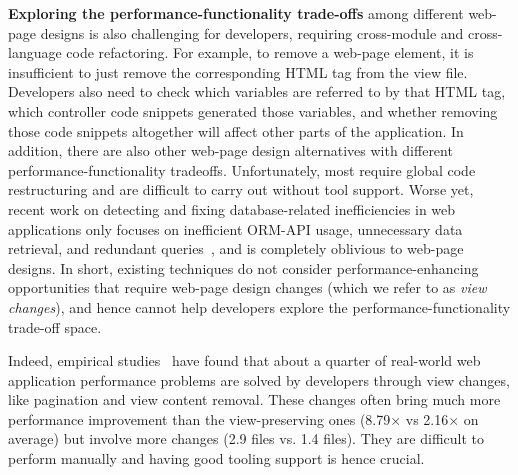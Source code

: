 {\bf Exploring the performance-functionality trade-offs} among different web-page
designs is also challenging for developers, requiring cross-module and cross-language
code refactoring. For example, to remove a web-page element, it is insufficient
to just remove the corresponding HTML tag from the view file. 
Developers also need to check which variables are referred to by that HTML tag, which controller code snippets generated those variables, and whether removing those code snippets altogether will affect other parts of the application. In addition, there are also other web-page design alternatives
with different performance-functionality tradeoffs. Unfortunately, most require global code restructuring and are difficult to carry out without tool support.
%
Worse yet, recent work on detecting and fixing database-related inefficiencies in
web applications only focuses on
inefficient ORM-API usage, unnecessary data retrieval, and redundant queries~\cite{mark:icse16:javascript, chen:se16:redundantData, yang:fse18:powerstation},
and is completely oblivious to web-page designs. In short, existing
techniques do not consider performance-enhancing opportunities that require 
web-page design changes (which we refer to as {\it view changes}), and hence
cannot help developers explore the performance-functionality trade-off space.

Indeed, empirical studies~\cite{yang:icse18:hloop} have found that about a quarter of real-world web application performance problems are solved by
developers through view changes, like pagination and view content removal.
These changes often bring much more performance improvement
than the view-preserving ones (8.79$\times$ vs 2.16$\times$ on average) but involve more changes (2.9 files vs. 1.4 files). They are difficult to perform manually and having good tooling support is hence crucial.




